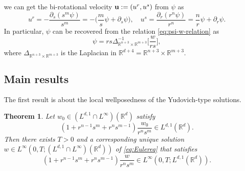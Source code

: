\documentclass[11pt]{amsart}
\newtheorem{thm}{Theorem}[section]
\theoremstyle{definition}
\theoremstyle{remark}
\numberwithin{equation}{section}
\numberwithin{equation}{section}
\newcommand{\lap}{\Delta}
\newcommand{\rd}{\partial}
\newcommand{\0}{\emptyset}
\newcommand{\ift}{\infty}
\newcommand{\zt}{\zeta}
\newcommand{\bfu}{{\bf u}}
\newcommand{\bbR}{\mathbb R}
\begin{document}
	we can get the bi-rotational velocity $\bfu:=(u^{r},u^{s})$ from $\psi$ as
	\begin{equation}\label{eq:psicurl}
		u^{r}=-\frac{\rd_{s}(s^{m}\psi)}{s^{m}}=-\bigg(\frac{m}{s}\psi+\rd_{s}\psi\bigg),\quad u^{s}=\frac{\rd_{r}(r^{n}\psi)}{r^{n}}=\frac{n}{r}\psi+\rd_{r}\psi.
	\end{equation}
	In particular, $\psi$ can be recovered from the relation \eqref{eq:psi-w-relation} as
	\begin{equation}\label{eq:psiinvlap}
		\psi%
		=rs\lap_{\bbR^{n+3}\times\bbR^{m+3}}^{-1}\bigg[\frac{w}{rs}\bigg],
	\end{equation}
	where $\lap_{\bbR^{n+3}\times\bbR^{m+3}}$ is the Laplacian in $\bbR^{d+4}=\bbR^{n+3}\times\bbR^{m+3}$.
	
	\subsection{Main results}
	
	The first result is about the local wellposedness of the Yudovich-type solutions.
	\begin{thm}\label{thm:LWP}
		Let $w_{0}\in (L^{d,1}\cap L^{\ift})(\bbR^{d})$ satisfy
		\begin{equation}
			(1+r^{n-1}s^{m}+r^{n}s^{m-1})\frac{w_{0}}{r^{n}s^{m}}\in L^{d,1}(\bbR^{d}).
		\end{equation}
		Then there exists $T>0$ and a corresponding unique solution $w\in L^{\ift}(0,T;(L^{d,1}\cap L^{\ift})(\bbR^{d}))$ of \eqref{eq:Eulereq} that satisfies
		\begin{equation}
			(1+r^{n-1}s^{m}+r^{n}s^{m-1})\frac{w}{r^{n}s^{m}}\in L^{\ift}(0,T;L^{d,1}(\bbR^{d})).
		\end{equation}
	\end{thm}
	
\end{document}
